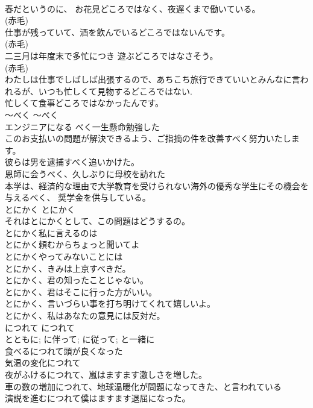 \documentclass[8pt]{extreport}
\begin{document}
\begin{CJK}{UTF8}{min}
\\	春だというのに、 お花見どころではなく、夜遅くまで働いている。  
\\	(赤毛)
\\	仕事が残っていて、酒を飲んでいるどころではないんです。  
\\	(赤毛)
\\	二三月は年度末で多忙につき 遊ぶどころではなさそう。  
\\	(赤毛)
\\	わたしは仕事でしばしば出張するので、あちこち旅行できていいとみんなに言われるが、いつも忙しくて見物するどころではない.   
\\	忙しくて食事どころではなかったんです。   
\\	〜べく	〜べく	
\\	エンジニアになる べく一生懸命勉強した  
\\	このお支払いの問題が解決できるよう、ご指摘の件を改善すべく努力いたします。  
\\	彼らは男を逮捕すべく追いかけた。  
\\	恩師に会うべく、久しぶりに母校を訪れた  
\\	本学は、経済的な理由で大学教育を受けられない海外の優秀な学生にその機会を与えるべく、 奨学金を供与している。  
\\	とにかく	とにかく	
\\	それはとにかくとして、この問題はどうするの。  
\\	とにかく私に言えるのは  
\\	とにかく頼むからちょっと聞いてよ  
\\	とにかくやってみないことには  
\\	とにかく、きみは上京すべきだ。  
\\	とにかく、君の知ったことじゃない。  
\\	とにかく、君はそこに行った方がいい。  
\\	とにかく、言いづらい事を打ち明けてくれて嬉しいよ。  
\\	とにかく、私はあなたの意見には反対だ。  
\\	につれて	につれて	
\\	とともに; に伴って; に従って; と一緒に	
\\	食べるにつれて頭が良くなった  
\\	気温の変化につれて  
\\	夜がふけるにつれて、嵐はますます激しさを増した。  
\\	車の数の増加につれて、地球温暖化が問題になってきた、と言われている  
\\	演説を進むにつれて僕はますます退屈になった。   

\end{CJK}
\end{document}
